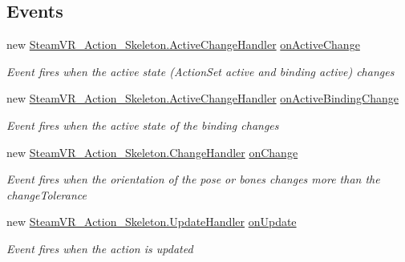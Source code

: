\subsection*{Events}
\begin{DoxyCompactItemize}
\item 
new \mbox{\hyperlink{class_valve_1_1_v_r_1_1_steam_v_r___action___skeleton_ae329ff2582f41c7ec52ecdf3b34b345a}{Steam\+V\+R\+\_\+\+Action\+\_\+\+Skeleton.\+Active\+Change\+Handler}} \mbox{\hyperlink{class_valve_1_1_v_r_1_1_steam_v_r___action___skeleton___source_ac3a839e79fa9302d13226bc7a3c90495}{on\+Active\+Change}}
\begin{DoxyCompactList}\small\item\em Event fires when the active state (Action\+Set active and binding active) changes \end{DoxyCompactList}\item 
new \mbox{\hyperlink{class_valve_1_1_v_r_1_1_steam_v_r___action___skeleton_ae329ff2582f41c7ec52ecdf3b34b345a}{Steam\+V\+R\+\_\+\+Action\+\_\+\+Skeleton.\+Active\+Change\+Handler}} \mbox{\hyperlink{class_valve_1_1_v_r_1_1_steam_v_r___action___skeleton___source_afafb5601f1e36a3801afec96e3d2d0c2}{on\+Active\+Binding\+Change}}
\begin{DoxyCompactList}\small\item\em Event fires when the active state of the binding changes \end{DoxyCompactList}\item 
new \mbox{\hyperlink{class_valve_1_1_v_r_1_1_steam_v_r___action___skeleton_a41a68545cb313ef9f47600d9e9022177}{Steam\+V\+R\+\_\+\+Action\+\_\+\+Skeleton.\+Change\+Handler}} \mbox{\hyperlink{class_valve_1_1_v_r_1_1_steam_v_r___action___skeleton___source_aba69647625587197739051f0df32076e}{on\+Change}}
\begin{DoxyCompactList}\small\item\em Event fires when the orientation of the pose or bones changes more than the change\+Tolerance \end{DoxyCompactList}\item 
new \mbox{\hyperlink{class_valve_1_1_v_r_1_1_steam_v_r___action___skeleton_a9fd666c2f3ccefc435275d85c525337c}{Steam\+V\+R\+\_\+\+Action\+\_\+\+Skeleton.\+Update\+Handler}} \mbox{\hyperlink{class_valve_1_1_v_r_1_1_steam_v_r___action___skeleton___source_a5ad6626808b28b817fc06003b1a9ca6a}{on\+Update}}
\begin{DoxyCompactList}\small\item\em Event fires when the action is updated \end{DoxyCompactList}\item 

\end{DoxyCompactItemize}
